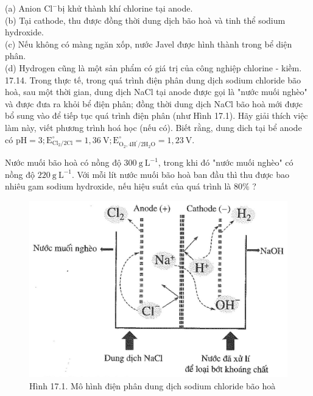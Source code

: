 \documentclass[10pt]{article}
\begin{document}
(a) Anion $\mathrm{Cl}^{-}$bị khử thành khí chlorine tại anode.\\
(b) Tại cathode, thu được đồng thời dung dịch bão hoà và tinh thể sodium hydroxide.\\
(c) Nếu không có màng ngăn xốp, nước Javel được hình thành trong bể diện phân.\\
(d) Hydrogen cũng là một sản phẩm có giá trị của công nghiệp chlorine - kiềm.\\
17.14. Trong thực tế, trong quá trình điện phân dung dịch sodium chloride bão hoà, sau một thời gian, dung dịch NaCl tại anode được gọi là "nước muối nghèo" và được đưa ra khỏi bể điện phân; đồng thời dung dịch NaCl bão hoà mới được bổ sung vào để tiếp tục quá trình điện phân (như Hình 17.1). Hãy giải thích việc làm này, viết phương trình hoá học (nếu có). Biết rằng, dung dich tại bể anode có $\mathrm{pH}=3 ; \mathrm{E}_{\mathrm{Cl}_{2} / 2 \mathrm{Cl}}^{\circ}=1,36 \mathrm{~V} ; \mathrm{E}_{\mathrm{O}_{2}, 4 \mathrm{H}^{\prime} / 2 \mathrm{H}_{2} \mathrm{O}}^{\circ}=1,23 \mathrm{~V}$.

Nước muối bão hoà có nồng độ $300 \mathrm{~g} \mathrm{~L}^{-1}$, trong khi đó "nước muối nghèo" có nồng độ $220 \mathrm{~g} \mathrm{~L}^{-1}$. Với mỗi lít nước muối bão hoà ban đầu thì thu được bao nhiêu gam sodium hydroxide, nếu hiệu suất của quá trình là $80 \%$ ?

\begin{figure}[h]
\begin{center}
  \includegraphics[width=\textwidth]{2025_10_23_80c1361fcdcd395cad8eg-55}
\captionsetup{labelformat=empty}
\caption{Hình 17.1. Mô hình điện phân dung dịch sodium chloride bão hoà}
\end{center}
\end{figure}
\end{document}
